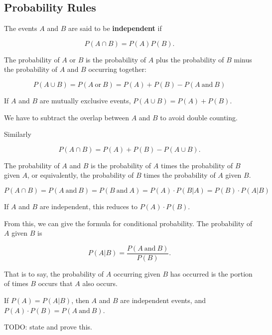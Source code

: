\documentclass{article}
\begin{document}
\subsection{Probability Rules}

\begin{definition}[Independence]
	The \@{events} $A$ and $B$ are said to be \textbf{independent} if

\[ P(A \cap B) = P(A)P(B). \]
\end{definition}

\begin{theorem}\label{probability-rules}
The \@{probability} of $A$ or $B$ is the probability of $A$ plus the probability of $B$ minus the probability of $A$ and $B$ occurring together:

\[ P(A \cup B) = P(A ~ \text{or} ~ B) = P(A) + P(B) - P(A ~ \text{and} ~ B) \]

If $A$ and $B$ are mutually exclusive \@{events}, $P(A \cup B)= P(A) + P(B).$

We have to subtract the overlap between $A$ and $B$ to avoid double counting.

Similarly

\[ P(A \cap B) = P(A) + P(B) - P(A \cup B). \]

The probability of $A$ and $B$ is the probability of $A$ times the probability of $B$ given $A$, or equivalently, the probability of $B$ times the probability of $A$ given $B$.

\[ P(A \cap B) = P(A ~ \text{and} ~ B) = P(B ~ \text{and} ~ A) = P(A) \cdot P(B|A) = P(B) \cdot P(A|B) \]

If $A$ and $B$ are \@{independent}, this reduces to $P(A) \cdot P(B)$.
\end{theorem}

\begin{definition}
From this, we can give the formula for conditional probability. The probability of $A$ given $B$ is

\[ P(A|B) = \frac{P(A ~\text{and} ~ B)}{P(B)}. \]

That is to say, the probability of $A$ occurring given $B$ has occurred is the portion of times $B$ occurs that $A$ also occurs.

If $P(A) = P(A|B)$, then $A$ and $B$ are \@{independent} events, and $P(A) \cdot P(B) = P(A ~ \text{and} ~ B).$
\end{definition}

\begin{theorem}
TODO: state and prove this.
\end{theorem}
\end{document}
